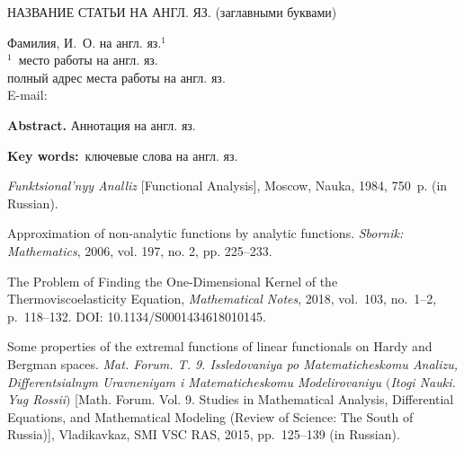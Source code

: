  \newpage



 \bigskip
 \begin{center}
 НАЗВАНИЕ СТАТЬИ НА АНГЛ. ЯЗ. (заглавными буквами)
 \end{center}


 \begin{center}
 Фамилия, И.~О. на англ. яз.$^{1}$\\[4pt]
 {\rm\footnotesize{$^1$\,
 место работы  на англ. яз.\\
 полный адрес места работы на англ. яз.\\
 E-mail: }}
 \end{center}



 {\footnotesize{\textbf{Abstract.} Аннотация на англ. яз.
 \par}

 {\footnotesize{\bf Key words:}~ключевые слова на англ. яз.
 \par}







 \Ref

 \begin{enumerate}
 {\footnotesize
 \itemsep=0pt
 \parskip=0pt

 {\it Funktsional'nyy Analliz} [Functional Analysis],
 Moscow,
 Nauka,
 1984,
 750~p.
 (in Russian).


 Approximation of non-analytic functions by analytic functions.
 {\it Sbornik: Mathematics},
 2006,
 vol. 197,
 no. 2,
 pp. 225--233.


  The Problem of Finding the One-Dimensional Kernel of the Thermoviscoelasticity Equation,
 \textit{Mathematical Notes},
 2018,
 vol.~103,
 no.~1--2,
 p.~118--132.
 DOI: 10.1134/S0001434618010145.


 Some properties of the extremal functions of linear functionals on Hardy and Bergman spaces.
 \textit{Mat. Forum. T. 9. Issledovaniya po Matematicheskomu Analizu, Differentsialnym Uravneniyam i Matematicheskomu Modelirovaniyu $($Itogi Nauki. Yug Rossii$)$}
 [Math. Forum. Vol. 9. Studies in Mathematical Analysis, Differential Equations, and Mathematical Modeling (Review of Science: The South of Russia)],
 Vladikavkaz, SMI VSC RAS,
 2015,
 pp.~125--139
 (in Russian).

}
\end{enumerate}}
